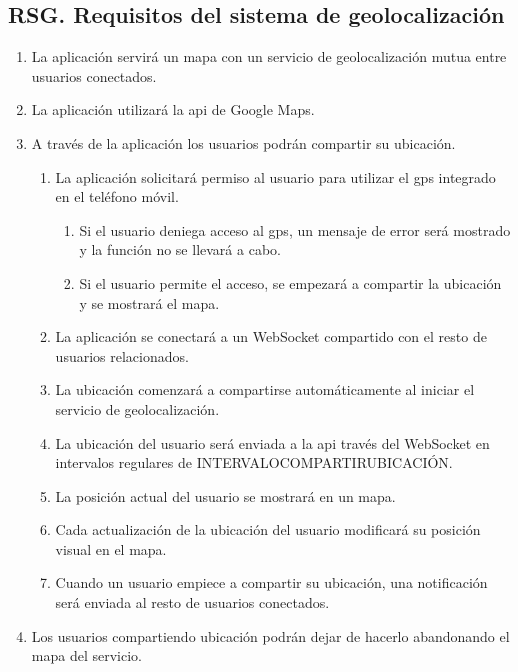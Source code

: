 \subsection{RSG. Requisitos del sistema de geolocalización}

\begin{enumerate}[label*=RSG \arabic*.]
    \item La aplicación servirá un mapa con un servicio de geolocalización mutua entre usuarios conectados.
    \item La aplicación utilizará la \acrshort{api} de Google Maps.
    \item \label{req:compartir_ubicacion} A través de la aplicación los usuarios podrán compartir su ubicación.
    \begin{enumerate}[label*=\arabic*.]
        \item La aplicación solicitará permiso al usuario para utilizar el \acrshort{gps} integrado en el teléfono móvil.
        \begin{enumerate}[label*=\arabic*.]
            \item Si el usuario deniega acceso al \acrshort{gps}, un mensaje de error será mostrado y la función no se llevará a cabo.
            \item Si el usuario permite el acceso, se empezará a compartir la ubicación y se mostrará el mapa.
        \end{enumerate}
        \item La aplicación se conectará a un WebSocket compartido con el resto de usuarios relacionados.
        \item La ubicación comenzará a compartirse automáticamente al iniciar el servicio de geolocalización.
        \item La ubicación del usuario será enviada a la \acrshort{api} través del WebSocket en intervalos regulares de INTERVALO\textunderscore COMPARTIR\textunderscore UBICACIÓN.
        \item La posición actual del usuario se mostrará en un mapa.
        \item Cada actualización de la ubicación del usuario modificará su posición visual en el mapa.
        \item \label{req:noti_ubicacion_empezar} Cuando un usuario empiece a compartir su ubicación, una notificación será enviada al resto de usuarios conectados.
    \end{enumerate}
    \item Los usuarios compartiendo ubicación podrán dejar de hacerlo abandonando el mapa del servicio.

\end{enumerate}
